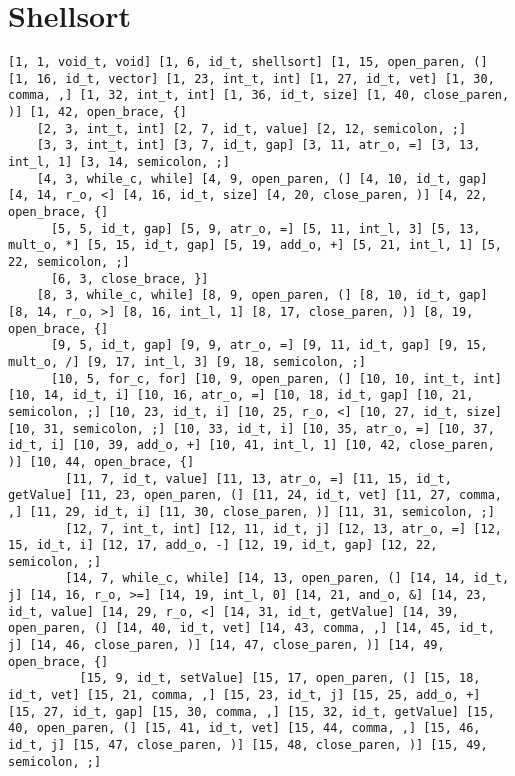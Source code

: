 \documentclass[12pt, a4paper]{memoir}
\begin{document}
\section{Shellsort}
\label{sec:shellsort}

\begin{lstlisting}[style=result]
  [1, 1, void_t, void] [1, 6, id_t, shellsort] [1, 15, open_paren, (] [1, 16, id_t, vector] [1, 23, int_t, int] [1, 27, id_t, vet] [1, 30, comma, ,] [1, 32, int_t, int] [1, 36, id_t, size] [1, 40, close_paren, )] [1, 42, open_brace, {]
    [2, 3, int_t, int] [2, 7, id_t, value] [2, 12, semicolon, ;]
    [3, 3, int_t, int] [3, 7, id_t, gap] [3, 11, atr_o, =] [3, 13, int_l, 1] [3, 14, semicolon, ;]
    [4, 3, while_c, while] [4, 9, open_paren, (] [4, 10, id_t, gap] [4, 14, r_o, <] [4, 16, id_t, size] [4, 20, close_paren, )] [4, 22, open_brace, {]
      [5, 5, id_t, gap] [5, 9, atr_o, =] [5, 11, int_l, 3] [5, 13, mult_o, *] [5, 15, id_t, gap] [5, 19, add_o, +] [5, 21, int_l, 1] [5, 22, semicolon, ;]
      [6, 3, close_brace, }]
    [8, 3, while_c, while] [8, 9, open_paren, (] [8, 10, id_t, gap] [8, 14, r_o, >] [8, 16, int_l, 1] [8, 17, close_paren, )] [8, 19, open_brace, {]
      [9, 5, id_t, gap] [9, 9, atr_o, =] [9, 11, id_t, gap] [9, 15, mult_o, /] [9, 17, int_l, 3] [9, 18, semicolon, ;]
      [10, 5, for_c, for] [10, 9, open_paren, (] [10, 10, int_t, int] [10, 14, id_t, i] [10, 16, atr_o, =] [10, 18, id_t, gap] [10, 21, semicolon, ;] [10, 23, id_t, i] [10, 25, r_o, <] [10, 27, id_t, size] [10, 31, semicolon, ;] [10, 33, id_t, i] [10, 35, atr_o, =] [10, 37, id_t, i] [10, 39, add_o, +] [10, 41, int_l, 1] [10, 42, close_paren, )] [10, 44, open_brace, {]
        [11, 7, id_t, value] [11, 13, atr_o, =] [11, 15, id_t, getValue] [11, 23, open_paren, (] [11, 24, id_t, vet] [11, 27, comma, ,] [11, 29, id_t, i] [11, 30, close_paren, )] [11, 31, semicolon, ;]
        [12, 7, int_t, int] [12, 11, id_t, j] [12, 13, atr_o, =] [12, 15, id_t, i] [12, 17, add_o, -] [12, 19, id_t, gap] [12, 22, semicolon, ;]
        [14, 7, while_c, while] [14, 13, open_paren, (] [14, 14, id_t, j] [14, 16, r_o, >=] [14, 19, int_l, 0] [14, 21, and_o, &] [14, 23, id_t, value] [14, 29, r_o, <] [14, 31, id_t, getValue] [14, 39, open_paren, (] [14, 40, id_t, vet] [14, 43, comma, ,] [14, 45, id_t, j] [14, 46, close_paren, )] [14, 47, close_paren, )] [14, 49, open_brace, {]
          [15, 9, id_t, setValue] [15, 17, open_paren, (] [15, 18, id_t, vet] [15, 21, comma, ,] [15, 23, id_t, j] [15, 25, add_o, +] [15, 27, id_t, gap] [15, 30, comma, ,] [15, 32, id_t, getValue] [15, 40, open_paren, (] [15, 41, id_t, vet] [15, 44, comma, ,] [15, 46, id_t, j] [15, 47, close_paren, )] [15, 48, close_paren, )] [15, 49, semicolon, ;]

\end{lstlisting}
\end{document}
